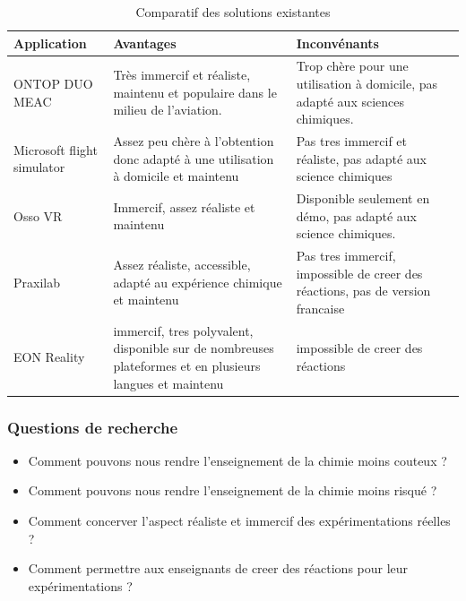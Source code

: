 \begin{table}[H]
    \centering
    \caption{Comparatif des solutions existantes}
	\begin{tabular}{|l|p{5cm}|p{5cm}|}
		\hline
		\textbf{Application}       & \textbf{Avantages}                                                                                      & \textbf{Inconvénants}                                                          \\ \hline
		ONTOP DUO MEAC             & Très immercif et réaliste, maintenu et populaire dans le milieu de l'aviation.                          & Trop chère pour une utilisation à domicile, pas adapté aux sciences chimiques. \\ \hline
		Microsoft flight simulator & Assez peu chère à l'obtention donc adapté à une utilisation à domicile et maintenu                      & Pas tres immercif et réaliste, pas adapté aux science chimiques                \\ \hline
		Osso VR                    & Immercif, assez réaliste et maintenu                                                                    & Disponible seulement en démo, pas adapté aux science chimiques.                \\ \hline
		Praxilab                   & Assez réaliste, accessible, adapté au expérience chimique et maintenu                                   & Pas tres immercif, impossible de creer des réactions, pas de version francaise \\ \hline
		EON Reality                & immercif, tres polyvalent, disponible sur de nombreuses plateformes et en plusieurs langues et maintenu & impossible de creer des réactions                                              \\ \hline
	\end{tabular}
\end{table}

\subsubsection{Questions de recherche}

\begin{itemize}
    \item Comment pouvons nous rendre l'enseignement de la chimie moins couteux ?
    \item Comment pouvons nous rendre l'enseignement de la chimie moins risqué ?
    \item Comment concerver l'aspect réaliste et immercif des expérimentations réelles ?
    \item Comment permettre aux enseignants de creer des réactions pour leur expérimentations ?
\end{itemize}